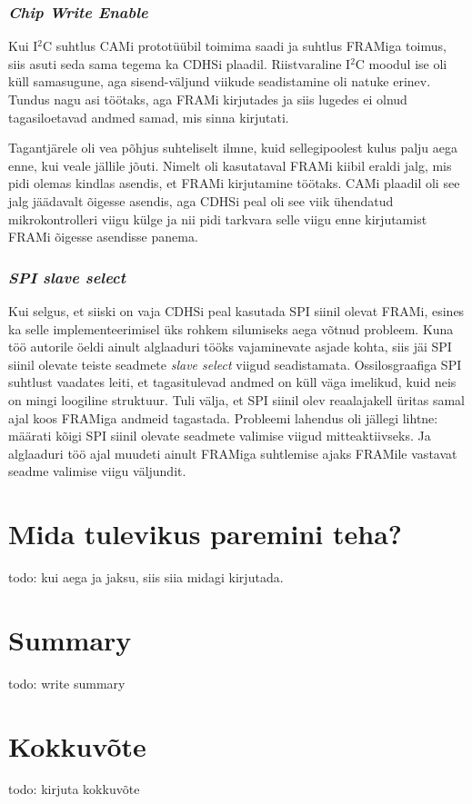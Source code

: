 \documentclass[12pt,a4paper]{article}
\newcommand{\iic}{I\({}^2\)C }
\begin{document}
\subsubsection{\textit{Chip Write Enable}}
Kui \iic suhtlus CAMi prototüübil toimima saadi ja suhtlus FRAMiga toimus, siis
asuti seda sama tegema ka CDHSi plaadil. Riistvaraline \iic moodul ise oli küll
samasugune, aga sisend-väljund viikude seadistamine oli natuke erinev. Tundus
nagu asi töötaks, aga FRAMi kirjutades ja siis lugedes ei olnud tagasiloetavad
andmed samad, mis sinna kirjutati.

Tagantjärele oli vea põhjus suhteliselt ilmne, kuid sellegipoolest kulus palju
aega enne, kui veale jällile jõuti. Nimelt oli kasutataval FRAMi kiibil eraldi
jalg, mis pidi olemas kindlas asendis, et FRAMi kirjutamine töötaks. CAMi
plaadil oli see jalg jäädavalt õigesse asendis, aga CDHSi peal oli see viik
ühendatud mikrokontrolleri viigu külge ja nii pidi tarkvara selle viigu enne
kirjutamist FRAMi õigesse asendisse panema.

\subsubsection{\textit{SPI slave select}}
Kui selgus, et siiski on vaja CDHSi peal kasutada SPI siinil olevat FRAMi,
esines ka selle implementeerimisel üks rohkem silumiseks aega võtnud probleem.
Kuna töö autorile öeldi ainult alglaaduri tööks vajaminevate asjade kohta, siis
jäi SPI siinil olevate teiste seadmete \textit{slave select} viigud
seadistamata. Ossilosgraafiga SPI suhtlust vaadates leiti, et tagasitulevad
andmed on küll väga imelikud, kuid neis on mingi loogiline struktuur. Tuli
välja, et SPI siinil olev reaalajakell üritas samal ajal koos FRAMiga andmeid
tagastada. Probleemi lahendus oli jällegi lihtne: määrati kõigi SPI siinil
olevate seadmete valimise viigud mitteaktiivseks. Ja alglaaduri töö ajal muudeti
ainult FRAMiga suhtlemise ajaks FRAMile vastavat seadme valimise viigu väljundit.

\section{Mida tulevikus paremini teha?}
todo: kui aega ja jaksu, siis siia midagi kirjutada.
\section{Summary}
todo: write summary
\section{Kokkuvõte}
todo: kirjuta kokkuvõte
\end{document}
